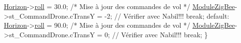 \begin{DoxyCode}
            \hyperlink{classQBase_ae4a8b78621695d9a61c311d422824a8d}{Horizon}->\hyperlink{classqAttitudeIndicator_a10c98e2fd9195050cb305f4b12bf75bb}{roll} = 30.0;
            \textcolor{comment}{/* Mise à jour des commandes de vol */}
            \hyperlink{classQBase_a466b6191fec7cd0029dfc547a5437752}{ModuleZigBee}->st\_CommandDrone.cTransY = -2;    \textcolor{comment}{//
      Vérifier avec Nabil!!!}
            \textcolor{keywordflow}{break};
        \textcolor{keywordflow}{default}:
            \hyperlink{classQBase_ae4a8b78621695d9a61c311d422824a8d}{Horizon}->\hyperlink{classqAttitudeIndicator_a10c98e2fd9195050cb305f4b12bf75bb}{roll} = 90.0;
            \textcolor{comment}{/* Mise à jour des commandes de vol */}
            \hyperlink{classQBase_a466b6191fec7cd0029dfc547a5437752}{ModuleZigBee}->st\_CommandDrone.cTransY = 0;    \textcolor{comment}{//
      Vérifier avec Nabil!!!}
            \textcolor{keywordflow}{break};
        \}


\end{DoxyCode}
